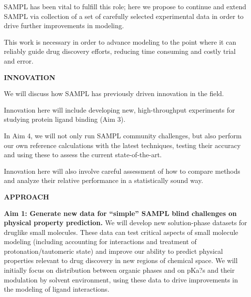 \documentclass[11pt]{article}
\begin{document}
SAMPL has been vital to fulfill this role; here we propose to continue and extend SAMPL via collection of a set of carefully selected experimental data in order to drive further improvements in modeling. %

This work is necessary in order to advance modeling to the point where it can reliably guide drug discovery efforts, reducing time consuming and costly trial and error. %


{\large \bf INNOVATION}

We will discuss how SAMPL has previously driven innovation in the field.


Innovation here will include developing new, high-throughput experiments for studying protein ligand binding (Aim 3).

In Aim 4, we will not only run SAMPL community challenges, but also perform our own reference calculations with the latest techniques, testing their accuracy and using these to assess the current state-of-the-art.

Innovation here will also involve careful assessment of how to compare methods and analyze their relative performance in a statistically sound way.

{\large \bf APPROACH}


{\bf Aim 1: Generate new data for ``simple'' SAMPL blind challenges on physical property prediction.}
We will develop new solution-phase datasets for druglike small molecules. These data can test critical aspects of small molecule modeling (including accounting for interactions and treatment of protonation/tautomeric state) and improve our ability to predict physical properties relevant to drug discovery in new regions of chemical space. We will initially focus on distribution between organic phases and on pKa?s and their modulation by solvent environment, using these data to drive improvements in the modeling of ligand interactions.
\end{document}

